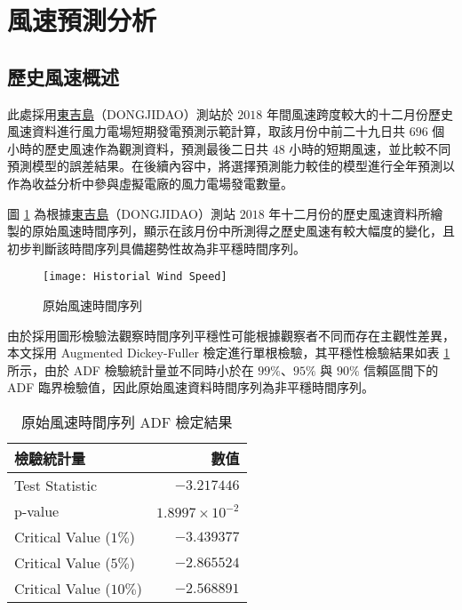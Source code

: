 
\section{風速預測分析}

\subsection{歷史風速概述}

此處採用\uline{東吉島}（DONGJIDAO）測站於 $2018$ 年間風速跨度較大的十二月份歷史風速資料進行風力電場短期發電預測示範計算，取該月份中前二十九日共 $696$ 個小時的歷史風速作為觀測資料，預測最後二日共 $48$ 小時的短期風速，並比較不同預測模型的誤差結果。在後續內容中，將選擇預測能力較佳的模型進行全年預測以作為收益分析中參與虛擬電廠的風力電場發電數量。

圖 \ref{figure: Historial Wind Speed} 為根據\uline{東吉島}（DONGJIDAO）測站 $2018$ 年十二月份的歷史風速資料所繪製的原始風速時間序列，顯示在該月份中所測得之歷史風速有較大幅度的變化，且初步判斷該時間序列具備趨勢性故為非平穩時間序列。

\begin{figure}[htbp]
  \centering
  \texttt{[image: Historial Wind Speed]}
  \caption{原始風速時間序列}
  \label{figure: Historial Wind Speed}
\end{figure}

由於採用圖形檢驗法觀察時間序列平穩性可能根據觀察者不同而存在主觀性差異，本文採用 Augmented Dickey-Fuller 檢定進行單根檢驗，其平穩性檢驗結果如表 \ref{table: Raw Time Series ADF Result} 所示，由於 ADF 檢驗統計量並不同時小於在 $99\%$、$95\%$ 與 $90\%$ 信賴區間下的 ADF 臨界檢驗值，因此原始風速資料時間序列為非平穩時間序列。

\begin{table}[htbp]
  \centering
  \caption[原始風速時間序列 ADF 檢定結果]{原始風速時間序列 ADF 檢定結果}
  \begin{tabular}{lr}
    \toprule
    \textbf{檢驗統計量} & \textbf{數值}     \\
    \midrule
    Test Statistic          & $-3.217446$   \\
    p-value                 & $1.8997 \times 10^{-2}$    \\
    Critical Value ($1\%$)  & $-3.439377$   \\
    Critical Value ($5\%$)  & $-2.865524$   \\
    Critical Value ($10\%$) & $-2.568891$   \\
    \bottomrule
  \end{tabular}
  \label{table: Raw Time Series ADF Result}
\end{table}

